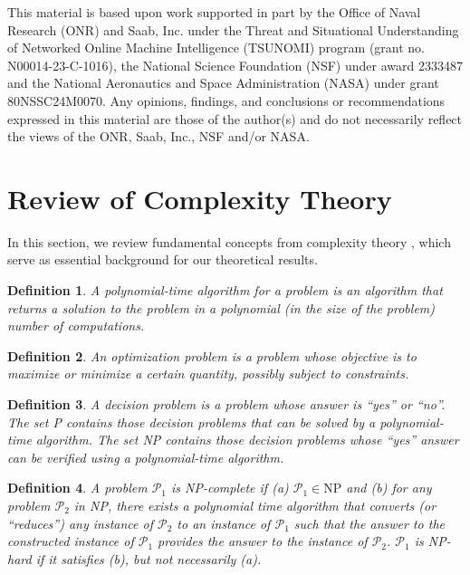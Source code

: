 \documentclass[twocolumn]{autart}    %
\newtheorem{definition}{Definition}
\begin{document}
\begin{ack}                        %
This material is based upon work supported in part by the Office of Naval Research (ONR) and Saab, Inc. under the Threat and Situational Understanding of Networked Online Machine Intelligence (TSUNOMI) program (grant no. N00014-23-C-1016), the National Science Foundation (NSF) under award 2333487 and the National Aeronautics and Space Administration (NASA) under grant 80NSSC24M0070. Any opinions, findings, and conclusions or recommendations expressed in this material are those of the author(s) and do not necessarily reflect the views of the ONR, Saab, Inc., NSF and/or NASA.  %
\end{ack}




\appendix

\section{Review of Complexity Theory}
\label{app:complexity_theory}
In this section, we review fundamental concepts from complexity theory \cite{garey1997computers}, which serve as essential background for our theoretical results.\\

\begin{definition}
\label{def:poly_alg}
    A polynomial-time algorithm for a problem is an algorithm that returns a solution to the problem in a polynomial (in the size of the problem) number of computations.
\end{definition}
\vspace{0.2cm}
\begin{definition}
    An optimization problem is a problem whose objective is to maximize or minimize a certain quantity, possibly subject to constraints.
\end{definition}
\vspace{0.2cm}
\begin{definition}
\label{def:dec_ver}
  A decision problem is a problem whose answer is ``yes'' or ``no''. The set P contains those decision problems that can be solved by a polynomial-time algorithm. The set NP contains those decision problems whose ``yes'' answer can be verified using a polynomial-time algorithm.
\end{definition}
\vspace{0.2cm}
\begin{definition}
    A problem $\mathcal{P}_1$ is NP-complete if (a) $\mathcal{P}_1 \in \mathrm{NP}$ and (b) for any problem $\mathcal{P}_2$ in NP, there exists a polynomial time algorithm that converts (or ``reduces'') any instance of $\mathcal{P}_2$ to an instance of $\mathcal{P}_1$ such that the answer to the constructed instance of $\mathcal{P}_1$ provides the answer to the instance of $\mathcal{P}_2$. $\mathcal{P}_1$ is NP-hard if it satisfies (b), but not necessarily (a).
\end{definition}
\end{document}
